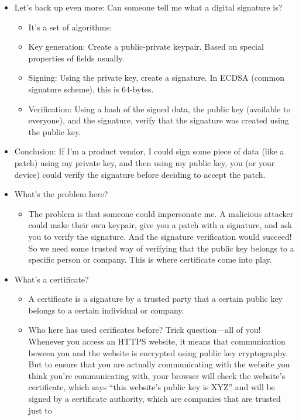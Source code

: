 \documentclass[11pt]{article}
\begin{document}
\begin{itemize}
\begin{itemize}
        \item Let's back up even more: Can someone tell me what a digital signature is?
        \begin{itemize}
            \item It's a set of algorithms:
            \item Key generation: Create a public-private keypair. Based on special properties of fields usually. 
            \item Signing: Using the private key, create a signature. In ECDSA (common signature scheme), this is 64-bytes.
            \item Verification: Using a hash of the signed data, the public key (available to everyone), and the signature, verify that the signature was created using the public key. 
        \end{itemize}
        \item Conclusion: If I'm a product vendor, I could sign some piece of data (like a patch) using my private key, and then using my public key, you (or your device) could verify the signature before deciding to accept the patch.
        \item What's the problem here? 
        \begin{itemize}
            \item The problem is that someone could impersonate me. A malicious attacker could make their own keypair, give you a patch with a signature, and ask you to verify the signature. And the signature verification would succeed! So we need some trusted way of verifying that the public key belongs to a specific person or company. This is where certificate come into play.
        \end{itemize}
        \item What's a certificate?
        \begin{itemize}
            \item A certificate is a signature by a trusted party that a certain public key belongs to a certain individual or company.
            \item Who here has used cerificates before? Trick question---all of you! Whenever you access an HTTPS website, it means that communication beween you and the website is encrypted using public key cryptography. But to ensure that you are actually communicating with the website you think you're communicating with, your browser will check the website's certificate, which says ``this website's public key is XYZ'' and will be signed by a certificate authority, which are companies that are trusted just to 

\end{itemize}
\end{itemize}
\end{itemize}
\end{document}
